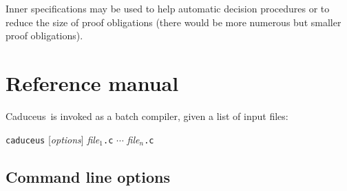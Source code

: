 \documentclass[a4paper,12pt]{report}
\newcommand{\caduceus}{\textsf{Caduceus}}
\begin{document}
Inner specifications may be used to help automatic decision procedures
or to reduce the size of proof obligations (there would be more
numerous but smaller proof obligations).


\chapter{Reference manual}
\label{refman}

\caduceus\ is invoked as a batch compiler, given a list of input files:
\begin{center}
  \texttt{caduceus} [\textit{options}] \textit{file}$_1$\texttt{.c} $\cdots$ \textit{file}$_n$\texttt{.c}
\end{center}

\section{Command line options}
\label{usage}
\end{document}
